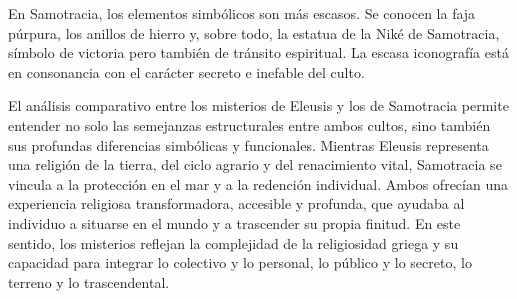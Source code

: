 En Samotracia, los elementos simbólicos son más escasos. Se conocen la faja púrpura, los anillos de hierro y, sobre todo, la estatua de la Niké de Samotracia, símbolo de victoria pero también de tránsito espiritual. La escasa iconografía está en consonancia con el carácter secreto e inefable del culto.

El análisis comparativo entre los misterios de Eleusis y los de Samotracia permite entender no solo las semejanzas estructurales entre ambos cultos, sino también sus profundas diferencias simbólicas y funcionales. Mientras Eleusis representa una religión de la tierra, del ciclo agrario y del renacimiento vital, Samotracia se vincula a la protección en el mar y a la redención individual. Ambos ofrecían una experiencia religiosa transformadora, accesible y profunda, que ayudaba al individuo a situarse en el mundo y a trascender su propia finitud. En este sentido, los misterios reflejan la complejidad de la religiosidad griega y su capacidad para integrar lo colectivo y lo personal, lo público y lo secreto, lo terreno y lo trascendental.

